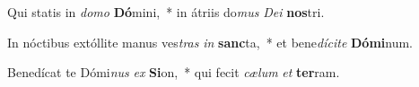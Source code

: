 \item Qui statis in \textit{do}\textit{mo} \textbf{Dó}mini,~* in átriis do\textit{mus} \textit{De}\textit{i} \textbf{nos}tri.
\item In nóctibus extóllite manus ves\textit{tras} \textit{in} \textbf{sanc}ta,~* et bene\textit{dí}\textit{ci}\textit{te} \textbf{Dó}\textbf{mi}num.
\item Benedícat te Dómi\textit{nus} \textit{ex} \textbf{Si}on,~* qui fecit \textit{cæ}\textit{lum} \textit{et} \textbf{ter}ram.
